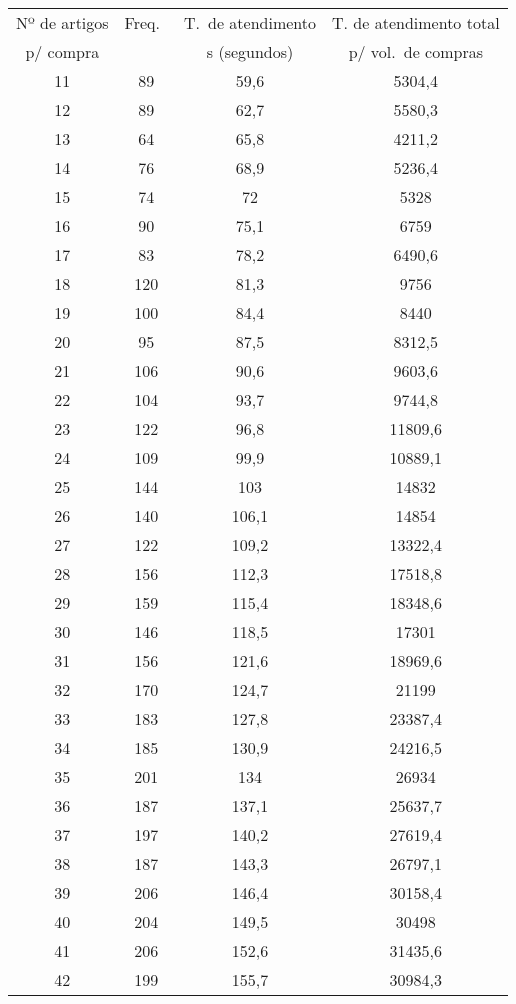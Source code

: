 \begin{longtable}[htpb]{@{}cccc@{}}
\toprule
Nº de artigos& Freq.\ & T.\ de atendimento& T. de atendimento total\\ 
p/ compra &~& s (segundos) & p/ vol.\ de compras \\ 
\midrule
11 & 89   & 59,6  & 5304,4  \\ 
12 & 89   & 62,7  & 5580,3  \\ 
13 & 64   & 65,8  & 4211,2  \\ 
14 & 76   & 68,9  & 5236,4  \\ 
15 & 74   & 72    & 5328    \\ 
16 & 90   & 75,1  & 6759    \\ 
17 & 83   & 78,2  & 6490,6  \\ 
18 & 120  & 81,3  & 9756    \\ 
19 & 100  & 84,4  & 8440    \\ 
20 & 95   & 87,5  & 8312,5  \\ 
21 & 106  & 90,6  & 9603,6  \\ 
22 & 104  & 93,7  & 9744,8  \\ 
23 & 122  & 96,8  & 11809,6 \\ 
24 & 109  & 99,9  & 10889,1 \\ 
25 & 144  & 103   & 14832   \\ 
26 & 140  & 106,1 & 14854   \\ 
27 & 122  & 109,2 & 13322,4 \\ 
28 & 156  & 112,3 & 17518,8 \\ 
29 & 159  & 115,4 & 18348,6 \\ 
30 & 146  & 118,5 & 17301   \\ 
31 & 156  & 121,6 & 18969,6 \\ 
32 & 170  & 124,7 & 21199   \\ 
33 & 183  & 127,8 & 23387,4 \\ 
34 & 185  & 130,9 & 24216,5 \\ 
35 & 201  & 134   & 26934   \\ 
36 & 187  & 137,1 & 25637,7 \\ 
37 & 197  & 140,2 & 27619,4 \\ 
38 & 187  & 143,3 & 26797,1 \\ 
39 & 206  & 146,4 & 30158,4 \\ 
40 & 204  & 149,5 & 30498   \\ 
41 & 206  & 152,6 & 31435,6 \\ 
42 & 199  & 155,7 & 30984,3 \\ 

\end{longtable}
